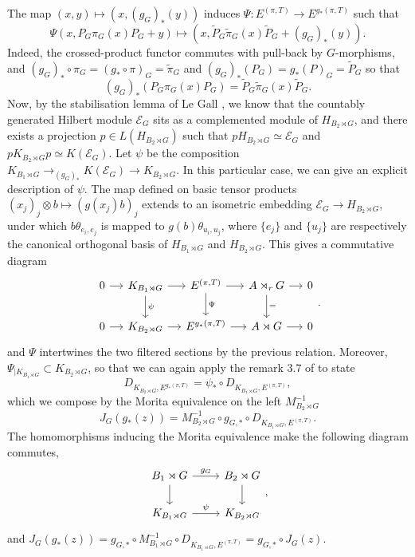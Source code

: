 \begin{dem}
\begin{enumerate}
The map $(x,y)\mapsto (x, (g_G)_*(y))$ induces $\Psi :E^{(\pi,T)}\rightarrow  E^{g_*(\pi,T)} $ such that
\[\Psi(x,P_G \pi_G(x) P_G +y)\mapsto (x,\tilde P_G \tilde\pi_G(x) \tilde P_G+(g_G)_*(y)).\]
Indeed, the crossed-product functor commutes with pull-back by $G$-morphisms, and $(g_G)_*\circ\pi_G=(g_*\circ\pi)_G=\tilde \pi_G$ and $(g_G)_*(P_G) = g_*(P)_G=\tilde P_G$ so that 
\[(g_G)_*(P_G \pi_G(x) P_G)=\tilde P_G \tilde\pi_G(x) \tilde P_G. \]
Now, by the stabilisation lemma of Le Gall \cite{LeGall}, we know that the countably generated Hilbert module $\mathcal E_G$ sits as a complemented module of $H_{B_2\rtimes G}$, and there exists a projection $p\in L(H_{B_2\rtimes G})$ such that $pH_{B_2\rtimes G}\simeq \mathcal E_G$ and $pK_{B_2\rtimes G}p\simeq K(\mathcal E_G)$. Let $\psi$ be the composition $K_{B_1\rtimes G}\rightarrow_{(g_G)_*} K(\mathcal E_G)\rightarrow K_{B_2\rtimes G}$. In this particular case, we can give an explicit description of $\psi$. The map defined on basic tensor products $(x_j)_{j}\otimes b\mapsto (g(x_j)b)_j $ extends to an isometric embedding $\mathcal E_G \rightarrow H_{B_2\rtimes G}$, under which $ b\theta_{e_i,e_j}$ is mapped to $g(b)\theta_{u_i,u_j}$, where $\{e_j\}$ and $\{u_j\}$ are respectively the canonical orthogonal basis of $H_{B_1 \rtimes G}$ and $H_{B_2 \rtimes G}$. This gives a commutative diagram 
\[\begin{tikzcd}[column sep = small]
0\arrow{r} & K_{B_1\rtimes G}\arrow{r}\arrow{d}{\psi} & E^{(\pi,T)} \arrow{r}\arrow{d}{\Psi}& A\rtimes_r G\arrow{r}\arrow{d}{=} & 0\\
0\arrow{r} & K_{B_2\rtimes G}\arrow{r} & E^{g_*(\pi,T)} \arrow{r}& A\rtimes G\arrow{r} & 0
\end{tikzcd}.\]
and $\Psi$ intertwines the two filtered sections by the previous relation. Moreover, $\Psi_{|K_{B_1\rtimes G}}\subset K_{B_2\rtimes G}$, so that we can again apply the remark $3.7$ of \cite{OY2} to state
\[ D_{K_{B_2\rtimes G},E^{g_*(\pi,T)}}=\psi_*\circ D_{K_{B_1\rtimes G},E^{(\pi,T)}},\]
which we compose by the Morita equivalence on the left $M_{B_2\rtimes G}^{-1}$
\[J_G(g_*(z)) = M_{B_2\rtimes G}^{-1}\circ g_{G,*}\circ D_{K_{B_1\rtimes G},E^{(\pi,T)}}.\]
The homomorphisms inducing the Morita equivalence make the following diagram commutes,
\[\begin{tikzcd}B_1\rtimes G\arrow{r}{g_G}\arrow{d} & B_2\rtimes G\arrow{d} \\ K_{B_1\rtimes G } \arrow{r}{\psi}& K_{B_2\rtimes G }\end{tikzcd},\]
and $J_G(g_*(z))= g_{G,*}\circ M_{B_1\rtimes G}^{-1}\circ D_{K_{B_1\rtimes G},E^{(\pi,T)}}=g_{G,*}\circ J_G(z)$.\\


\end{enumerate}
\end{dem}
